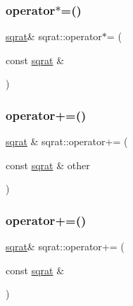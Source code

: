 \mbox{\label{classsqrat_aae14e57b87f37f2073e809efd51fbe8e}} 
\subsubsection{\texorpdfstring{operator$\ast$=()}{operator*=()}\hspace{0.1cm}{\footnotesize\ttfamily [3/3]}}
{\footnotesize\ttfamily \mbox{\hyperlink{classsqrat}{sqrat}}\& sqrat\+::operator$\ast$= (\begin{DoxyParamCaption}\item[{const \mbox{\hyperlink{classsqrat}{sqrat}} \&}]{ }\end{DoxyParamCaption})}

\mbox{\label{classsqrat_a6b114d2daa3204ec91671ad701f177c0}} 
\subsubsection{\texorpdfstring{operator+=()}{operator+=()}\hspace{0.1cm}{\footnotesize\ttfamily [1/3]}}
{\footnotesize\ttfamily \mbox{\hyperlink{classsqrat}{sqrat}} \& sqrat\+::operator+= (\begin{DoxyParamCaption}\item[{const \mbox{\hyperlink{classsqrat}{sqrat}} \&}]{other }\end{DoxyParamCaption})}

\mbox{\label{classsqrat_ada81ae4a5701bba66394cf1a69786e70}} 
\subsubsection{\texorpdfstring{operator+=()}{operator+=()}\hspace{0.1cm}{\footnotesize\ttfamily [2/3]}}
{\footnotesize\ttfamily \mbox{\hyperlink{classsqrat}{sqrat}}\& sqrat\+::operator+= (\begin{DoxyParamCaption}\item[{const \mbox{\hyperlink{classsqrat}{sqrat}} \&}]{ }\end{DoxyParamCaption})}

